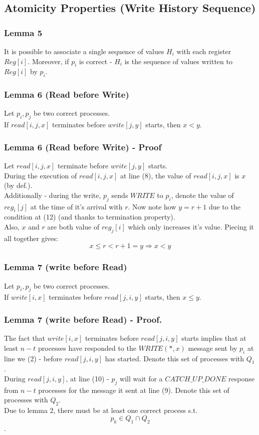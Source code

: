 \subsection{Atomicity Properties (Write History Sequence)}
\begin{frame}
    \frametitle{Lemma 5}
    \begin{lemma}
        It is possible to associate a single sequence of values $H_i$
        with each register $Reg[i]$. Moreover, if $p_i$ is correct -
        $H_i$ is the sequence of values written to $Reg[i]$ by $p_i$.
    \end{lemma}
\end{frame}
\begin{frame}
    \frametitle{Lemma 6 (Read before Write)}
    \begin{lemma}
        Let $p_i, p_j$ be two correct processes.\\
        If $read[i,j,x]$ terminates before $write[j,y]$ starts, then $x<y$.
    \end{lemma}
\end{frame}
\begin{frame}
    \frametitle{Lemma 6 (Read before Write) - Proof}
        Let $read[i,j,x]$ terminate before $write[j,y]$ starts.\\
        During the execution of $read[i,j,x]$ at line (8), the value of $read[i,j,x]$
        is $x$ (by def.).\\
        Additionally - during the write, $p_j$ sends $WRITE$ to
        $p_i$, denote the value of $reg_i[j]$ at the time of it's arrival
        with $r$. Now note how $y=r+1$ due to the condition at (12) (and thanks to termination property).\\
        Also, $x$ and $r$ are both value of $reg_j[i]$ which only increases it's value.
        Piecing it all together gives:
        \[
            x\leq r<r+1=y \Rightarrow x<y
        \]
\end{frame}
\begin{frame}
    \frametitle{Lemma 7 (write before Read)}
    \begin{lemma}
        Let $p_i, p_j$ be two correct processes.\\
        If $write[i,x]$ terminates before $read[j,i,y]$ starts, then $x\leq y$.
    \end{lemma}
\end{frame}
\begin{frame}
    \frametitle{Lemma 7 (write before Read) - Proof.}
    The fact that $write[i,x]$ terminates before $read[j,i,y]$ starts
    implies that at least $n-t$ processes have responded to the
    $WRITE(*,x)$ message sent by $p_i$ at line we (2) - before $read[j,i,y]$ has started. Denote
    this set of processes with \alert{$Q_1$}.\\
    During $read[j,i,y]$, at line (10) - $p_j$ will wait for a $CATCH\_UP\_DONE$ response from
    $n-t$ processes for the message it sent at line (9).
    Denote this set of processes with \alert{$Q_2$}.\\
    Due to lemma 2, there must be at least one correct process s.t. \alert{
        \[p_k\in Q_1\cap Q_2\]
    }.
\end{frame}
